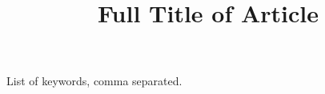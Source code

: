 \documentclass{midl} %
\title[Short Title]{Full Title of Article}
\begin{document}
\maketitle

\begin{abstract}
	
\end{abstract}

\begin{keywords}
	List of keywords, comma separated.
\end{keywords}





\end{document}
